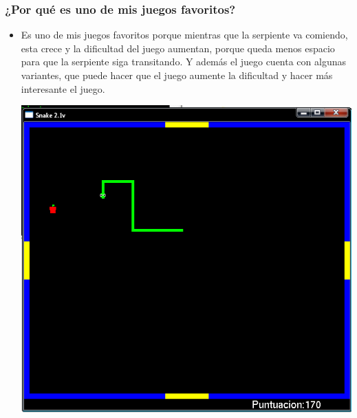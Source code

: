 \subsubsection{¿Por qué es uno de mis juegos favoritos?}
\begin{itemize}
\item Es uno de mis juegos favoritos porque mientras que la serpiente va comiendo, esta crece y la dificultad del juego aumentan, porque queda menos espacio para que la serpiente siga transitando.
Y además el juego cuenta con algunas variantes, que puede hacer que el juego aumente la dificultad y hacer más interesante el juego.

\begin{center}
\includegraphics[width=.60\textwidth]{./imagenes/snake2.png}
\label{Snake2}
\end{center}

\end{itemize}
